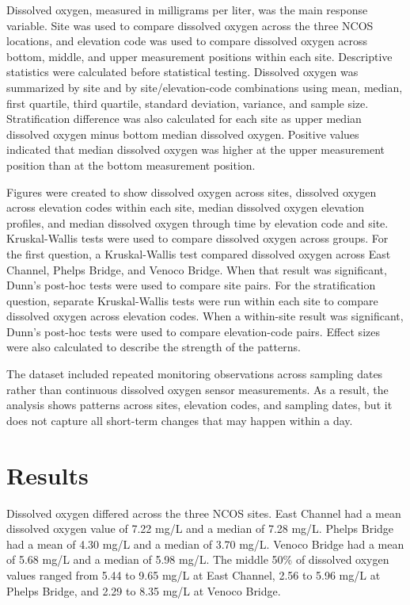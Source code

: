 \documentclass[
  letterpaper,
  DIV=11,
  numbers=noendperiod]{scrartcl}
\begin{document}
Dissolved oxygen, measured in milligrams per liter, was the main
response variable. Site was used to compare dissolved oxygen across the
three NCOS locations, and elevation code was used to compare dissolved
oxygen across bottom, middle, and upper measurement positions within
each site. Descriptive statistics were calculated before statistical
testing. Dissolved oxygen was summarized by site and by
site/elevation-code combinations using mean, median, first quartile,
third quartile, standard deviation, variance, and sample size.
Stratification difference was also calculated for each site as upper
median dissolved oxygen minus bottom median dissolved oxygen. Positive
values indicated that median dissolved oxygen was higher at the upper
measurement position than at the bottom measurement position.

Figures were created to show dissolved oxygen across sites, dissolved
oxygen across elevation codes within each site, median dissolved oxygen
elevation profiles, and median dissolved oxygen through time by
elevation code and site. Kruskal-Wallis tests were used to compare
dissolved oxygen across groups. For the first question, a Kruskal-Wallis
test compared dissolved oxygen across East Channel, Phelps Bridge, and
Venoco Bridge. When that result was significant, Dunn's post-hoc tests
were used to compare site pairs. For the stratification question,
separate Kruskal-Wallis tests were run within each site to compare
dissolved oxygen across elevation codes. When a within-site result was
significant, Dunn's post-hoc tests were used to compare elevation-code
pairs. Effect sizes were also calculated to describe the strength of the
patterns.

The dataset included repeated monitoring observations across sampling
dates rather than continuous dissolved oxygen sensor measurements. As a
result, the analysis shows patterns across sites, elevation codes, and
sampling dates, but it does not capture all short-term changes that may
happen within a day.

\section{Results}\label{results}

Dissolved oxygen differed across the three NCOS sites. East Channel had
a mean dissolved oxygen value of 7.22 mg/L and a median of 7.28 mg/L.
Phelps Bridge had a mean of 4.30 mg/L and a median of 3.70 mg/L. Venoco
Bridge had a mean of 5.68 mg/L and a median of 5.98 mg/L. The middle
50\% of dissolved oxygen values ranged from 5.44 to 9.65 mg/L at East
Channel, 2.56 to 5.96 mg/L at Phelps Bridge, and 2.29 to 8.35 mg/L at
Venoco Bridge.
\end{document}
